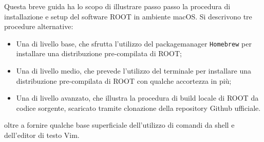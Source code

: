 Questa breve guida ha lo scopo di illustrare passo passo la procedura di installazione e setup del software ROOT in ambiente macOS. Si descrivono tre procedure alternative:
\begin{itemize}
    \item Una di livello base, che sfrutta l'utilizzo del packagemanager \texttt{Homebrew} per installare una distribuzione pre-compilata di ROOT;
    \item Una di livello medio, che prevede l'utilizzo del terminale per installare una distribuzione pre-compilata di ROOT con qualche accortezza in più;
    \item Una di livello avanzato, che illustra la procedura di build locale di ROOT da codice sorgente, scaricato tramite clonazione della repository Github ufficiale.
\end{itemize}


oltre a fornire qualche base superficiale dell'utilizzo di comandi da shell e dell'editor di testo Vim.